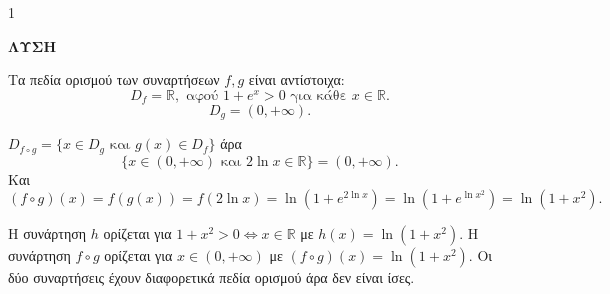 \begin{ylh}{1}
    \item [Συναρτήσεις - Πεδίο Ορισμού - Σύνθεση]
\end{ylh}
\textbf{ΛΥΣΗ}
\begin{alist}
\item Τα πεδία ορισμού των συναρτήσεων $f, g$ είναι αντίστοιχα:
    \[ D_f = \mathbb{R}, \text{ αφού } 1+e^x > 0 \text{ για κάθε } x \in \mathbb{R}. \]
    \[ D_g = (0, +\infty). \]
\item $D_{f \circ g} = \{x \in D_g \text{ και } g(x) \in D_f \}$ άρα
    \[ \{x \in (0, +\infty) \text{ και } 2\ln x \in \mathbb{R}\} = (0, +\infty). \]
    Και
    \[ (f \circ g)(x) = f(g(x)) = f(2\ln x) = \ln(1+e^{2\ln x}) = \ln(1+e^{\ln x^2}) = \ln(1+x^2). \]
\item Η συνάρτηση $h$ ορίζεται για $1+x^2>0 \Leftrightarrow x \in \mathbb{R}$ με $h(x) = \ln(1+x^2)$.
    Η συνάρτηση $f \circ g$ ορίζεται για $x \in (0, +\infty)$ με $(f \circ g)(x) = \ln(1+x^2)$.
    Οι δύο συναρτήσεις έχουν διαφορετικά πεδία ορισμού άρα δεν είναι ίσες.
\end{alist}